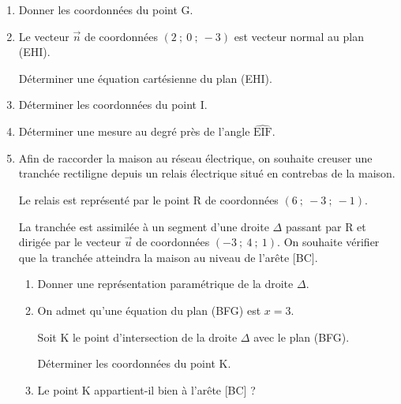 \documentclass[10pt]{article}
\providecommand{\vect}[1]{\overrightarrow{#1}}
\begin{document}
\begin{enumerate}
\item Donner les coordonnées du point G.
\item Le vecteur $\vect{n}$ de coordonnées $(2~;~0~;~-3)$ est vecteur normal au plan (EHI).

Déterminer une équation cartésienne du plan (EHI).
\item Déterminer les coordonnées du point I.
\item Déterminer une mesure au degré près de l'angle $\widehat{\text{EIF}}$.
\item Afin de raccorder la maison au réseau électrique, on souhaite creuser une tranchée rectiligne depuis un relais électrique situé en contrebas de la maison.

Le relais est représenté par le point R de coordonnées $(6~;~- 3~;~- 1)$.

La tranchée est assimilée à un segment d'une droite $\Delta$ passant par R et dirigée par le vecteur $\vect{u}$ de coordonnées $(-3~;~4~;~1)$. On souhaite vérifier que la tranchée atteindra la maison au niveau de l'arête [BC].
	\begin{enumerate}
		\item Donner une représentation paramétrique de la droite $\Delta$.
		\item On admet qu'une équation du plan (BFG) est $x = 3$.
		
Soit K le point d'intersection de la droite $\Delta$ avec le plan (BFG).

Déterminer les coordonnées du point K.
		\item Le point K appartient-il bien à l'arête [BC] ?
	\end{enumerate}
\end{enumerate}

\bigskip
\end{document}
